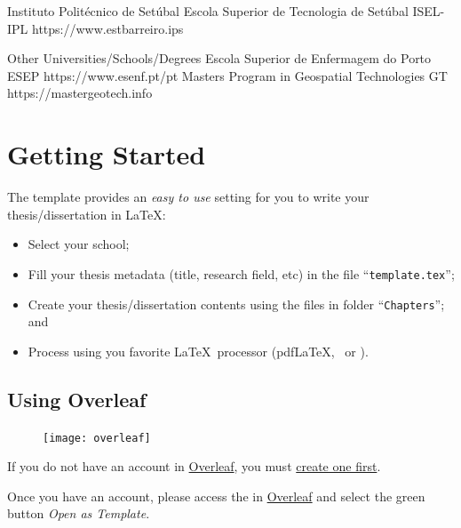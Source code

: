 \begin{ntUniversity}{Instituto Politécnico de Setúbal}
             {Escola Superior de Tecnologia de Setúbal}%
             {ISEL-IPL}%
             {https://www.estbarreiro.ips}%
\end{ntUniversity}

\begin{ntUniversity}{Other Universities/Schools/Degrees}
             {Escola Superior de Enfermagem do Porto}%
             {ESEP}%
             {https://www.esenf.pt/pt}%
             {Masters Program in Geospatial Technologies}%
             {GT}%
             {https://mastergeotech.info}%
\end{ntUniversity}


\section{Getting Started}
\label{sec:getting_started}

The template provides an \emph{easy to use} setting for you to write your thesis/dissertation in \LaTeX:
\begin{itemize}
  \item  Select your school;
  \item Fill your thesis metadata (title, research field, etc) in the file “\texttt{template.tex}”;
  \item Create your thesis/dissertation contents using the files in folder “\texttt{Chapters}”; and
  \item Process using you favorite \LaTeX\ processor (pdf\LaTeX, \XeLaTeX\ or \LuaLaTeX).
\end{itemize}

\subsection{Using Overleaf}
\label{sub:using_overleaf}

\begin{figure}
\vspace*{-15ex}\texttt{[image: overleaf]}%
\end{figure}

If you do not have an account in \href{https://www.overleaf.com?r=f5160636&rm=d&rs=b}{Overleaf}, you must \href{https://www.overleaf.com?r=f5160636&rm=d&rs=b}{create one first}.

Once you have an account, please access the  in \href{https://www.overleaf.com/latex/templates/new-university-of-lisbon-universidade-nova-de-lisboa-slash-unl-thesis-template/fwbztcrptjmg}{Overleaf} and select the green button \emph{Open as Template}. 

